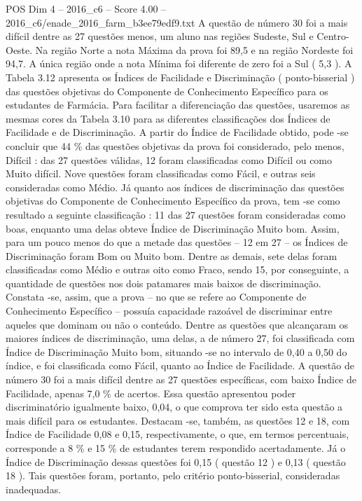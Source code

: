 \begin{textsample}{POS Dim 4 – 2016\_c6 – Score 4.00 – 2016\_c6/enade\_2016\_farm\_b3ee79edf9.txt}
A questão de número 30 foi a mais difícil dentre as 27 questões menos, um aluno nas regiões Sudeste, Sul e Centro-Oeste.
Na região Norte a nota Máxima da prova foi 89,5 e na região Nordeste foi 94,7.
A única região onde a nota Mínima foi diferente de zero foi a Sul ( 5,3 ).
A Tabela 3.12 apresenta os Índices de Facilidade e Discriminação ( ponto-bisserial ) das questões objetivas do Componente de Conhecimento Específico para os estudantes de Farmácia.
Para facilitar a diferenciação das questões, usaremos as mesmas cores da Tabela 3.10 para as diferentes classificações dos Índices de Facilidade e de Discriminação.
A partir do Índice de Facilidade obtido, pode -se concluir que 44 \% das questões objetivas da prova foi considerado, pelo menos, Difícil : das 27 questões válidas, 12 foram classificadas como Difícil ou como Muito difícil.
Nove questões foram classificadas como Fácil, e outras seis consideradas como Médio.
Já quanto aos índices de discriminação das questões objetivas do Componente de Conhecimento Específico da prova, tem -se como resultado a seguinte classificação : 11 das 27 questões foram consideradas como boas, enquanto uma delas obteve Índice de Discriminação Muito bom.
Assim, para um pouco menos do que a metade das questões – 12 em 27 – os Índices de Discriminação foram Bom ou Muito bom.
Dentre as demais, sete delas foram classificadas como Médio e outras oito como Fraco, sendo 15, por conseguinte, a quantidade de questões nos dois patamares mais baixos de discriminação.
Constata -se, assim, que a prova – no que se refere ao Componente de Conhecimento Específico – possuía capacidade razoável de discriminar entre aqueles que dominam ou não o conteúdo.
Dentre as questões que alcançaram os maiores índices de discriminação, uma delas, a de número 27, foi classificada com Índice de Discriminação Muito bom, situando -se no intervalo de 0,40 a 0,50 do índice, e foi classificada como Fácil, quanto ao Índice de Facilidade.
A questão de número 30 foi a mais difícil dentre as 27 questões específicas, com baixo Índice de Facilidade, apenas 7,0 \% de acertos.
Essa questão apresentou poder discriminatório igualmente baixo, 0,04, o que comprova ter sido esta questão a mais difícil para os estudantes.
Destacam -se, também, as questões 12 e 18, com Índice de Facilidade 0,08 e 0,15, respectivamente, o que, em termos percentuais, corresponde a 8 \% e 15 \% de estudantes terem respondido acertadamente.
Já o Índice de Discriminação dessas questões foi 0,15 ( questão 12 ) e 0,13 ( questão 18 ).
Tais questões foram, portanto, pelo critério ponto-bisserial, consideradas inadequadas.

\end{textsample}
